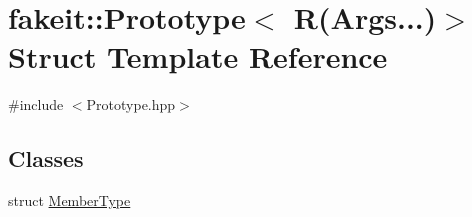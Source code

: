 \hypertarget{structfakeit_1_1Prototype_3_01R_07Args_8_8_8_08_4}{}\section{fakeit\+::Prototype$<$ R(Args...)$>$ Struct Template Reference}
\label{structfakeit_1_1Prototype_3_01R_07Args_8_8_8_08_4}


{\ttfamily \#include $<$Prototype.\+hpp$>$}

\subsection*{Classes}
\begin{DoxyCompactItemize}
\item 
struct \mbox{\hyperlink{structfakeit_1_1Prototype_3_01R_07Args_8_8_8_08_4_1_1MemberType}{Member\+Type}}
\end{DoxyCompactItemize}
